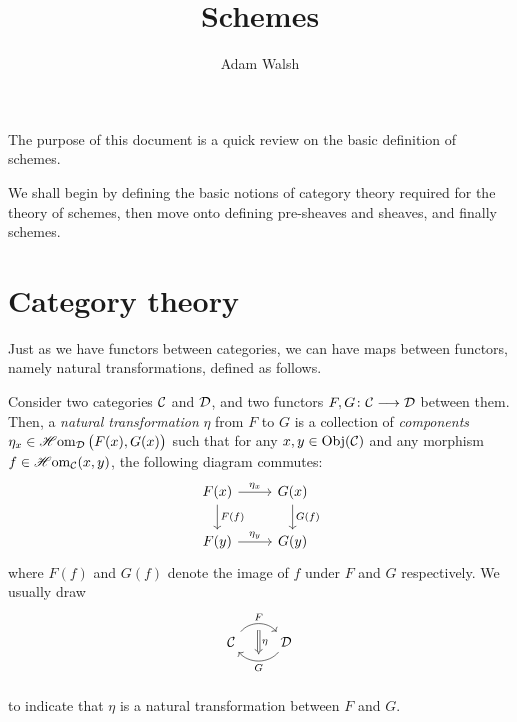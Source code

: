\documentclass[a4paper]{amsart}
\title{Schemes}
\author{Adam Walsh}
\begin{document}
\maketitle
The purpose of this document is a quick review on the basic definition of schemes.

We shall begin by defining the basic notions of category theory required for the theory of schemes, then move onto defining pre-sheaves and sheaves, and finally schemes.
\section{Category theory}
Just as we have functors between categories, we can have maps between functors, namely natural transformations, defined as follows.
\begin{Definition}
    Consider two categories $\mathcal{C}$ and $\mathcal{D}$, and two functors $F,G\colon\mathcal{C}\longrightarrow \mathcal{D}$ between them. Then, a \emph{natural transformation} $\eta$ from $F$ to $G$ is a collection of \emph{components} $\eta_x \in \operatorname{\mathscr{H}om}_{\mathcal{D}}\big( F(x), G(x) \big)$ such that for any $x,y\in \operatorname{Obj}(\mathcal{C})$ and any morphism $f\in \operatorname{\mathscr{H}om}_{\mathcal{C}}(x,y)$, the following diagram commutes:
    \[
        \begin{tikzcd}
            F(x) \arrow[r, "\eta_x"] \arrow[d, "F(f)"] & G(x) \arrow[d,"G(f)"] \\
            F(y) \arrow[r,"\eta_y"]  & G(y)
        \end{tikzcd}
    \]
    where $F(f)$ and $G(f)$ denote the image of $f$ under $F$ and $G$ respectively. We usually draw
    \[
        \begin{tikzcd}
            \cC \arrow[r, bend left=50, "F"{above}, ""{name=A,below}]  & \cD \arrow[l, bend left=50, "G"{below}, ""{name=B, above}]\\
            \arrow[Rightarrow, from=A, to=B, "\eta"]
        \end{tikzcd}
    \]
    to indicate that $\eta$ is a natural transformation between $F$ and $G$.
\end{Definition}
\end{document}
